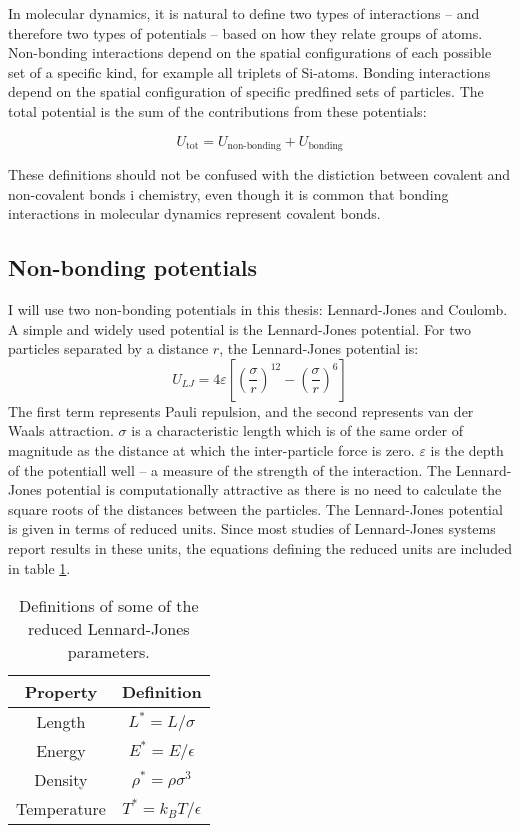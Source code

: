 In molecular dynamics, it is natural to define two types of interactions -- and therefore two types of potentials -- based on how they relate groups of atoms. Non-bonding interactions depend on the spatial configurations of each possible set of a specific kind, for example all triplets of Si-atoms. Bonding interactions depend on the spatial configuration of specific predfined sets of particles. The total potential is the sum of the contributions from these potentials: 

\begin{equation}
	U_{\text{tot}} = U_{\text{non-bonding}} + U_{\text{bonding}} 
\end{equation}

These definitions should not be confused with the distiction between covalent and non-covalent bonds i chemistry, even though it is common that bonding interactions in molecular dynamics represent covalent bonds.

\subsection{Non-bonding potentials}
\label{sec:non_bonding_potentials}
I will use two non-bonding potentials in this thesis: Lennard-Jones and Coulomb.
A simple and widely used potential is the Lennard-Jones potential. For two particles separated by a distance $r$, the Lennard-Jones potential is:
\begin{equation}
	U_{LJ} = 4\varepsilon\left[\left(\frac{\sigma}{r}\right)^{12} - \left(\frac{\sigma}{r}\right)^{6}\right]
\end{equation}
The first term represents Pauli repulsion, and the second represents van der Waals attraction. $\sigma$ is a characteristic length which is of the same order of magnitude as the distance at which the inter-particle force is zero. $\varepsilon$ is the depth of the potentiall well -- a measure of the strength of the interaction. The Lennard-Jones potential is computationally attractive as there is no need to calculate the square roots of the distances between the particles. The Lennard-Jones potential is given in terms of reduced units. Since most studies of Lennard-Jones systems report results in these units, the equations defining the  reduced units are included in table \ref{tbl:lj_parameters}.

\begin{table}
\centering
\caption{Definitions of some of the reduced Lennard-Jones parameters.}
\label{tbl:lj_parameters}
\begin{tabular}{c|c}
\textbf{Property} & \textbf{Definition} \\
\hline
Length & $L^* = L/\sigma$ \\
Energy & $E^* = E/\epsilon$ \\
Density & $\rho^* = \rho \sigma^3$ \\
Temperature & $T^* = k_BT/\epsilon$ \\
\end{tabular}
\end{table} 

